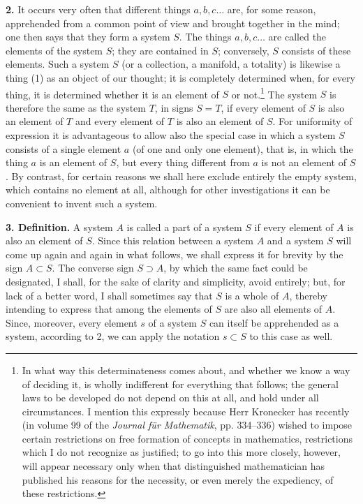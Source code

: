 \documentclass[11pt]{article}
\newcommand{\partof}{\mathrel{\subset}}
\newcommand{\wholeof}{\mathrel{\supset}}
\begin{document}
\noindent\textbf{2.} It occurs very often that different things $a,b,c\ldots$ are, for some reason, apprehended from a common point of view and brought together in the mind; one then says that they form a system $S$. The things $a,b,c\ldots$ are called the elements of the system $S$; they are contained in $S$; conversely, $S$ consists of these elements. Such a system $S$ (or a collection, a manifold, a totality) is likewise a thing (1) as an object of our thought; it is completely determined when, for every thing, it is determined whether it is an element of $S$ or not.\footnote{In what way this determinateness comes about, and whether we know a way of deciding it, is wholly indifferent for everything that follows; the general laws to be developed do not depend on this at all, and hold under all circumstances. I mention this expressly because Herr Kronecker has recently (in volume 99 of the \emph{Journal für Mathematik}, pp. 334--336) wished to impose certain restrictions on free formation of concepts in mathematics, restrictions which I do not recognize as justified; to go into this more closely, however, will appear necessary only when that distinguished mathematician has published his reasons for the necessity, or even merely the expediency, of these restrictions.} The system $S$ is therefore the same as the system $T$, in signs $S=T$, if every element of $S$ is also an element of $T$ and every element of $T$ is also an element of $S$. For uniformity of expression it is advantageous to allow also the special case in which a system $S$ consists of a single element $a$ (of one and only one element), that is, in which the thing $a$ is an element of $S$, but every thing different from $a$ is not an element of $S$. By contrast, for certain reasons we shall here exclude entirely the empty system, which contains no element at all, although for other investigations it can be convenient to invent such a system.

\noindent\textbf{3. Definition.} A system $A$ is called a part of a system $S$ if every element of $A$ is also an element of $S$. Since this relation between a system $A$ and a system $S$ will come up again and again in what follows, we shall express it for brevity by the sign $A\partof S$. The converse sign $S\wholeof A$, by which the same fact could be designated, I shall, for the sake of clarity and simplicity, avoid entirely; but, for lack of a better word, I shall sometimes say that $S$ is a whole of $A$, thereby intending to express that among the elements of $S$ are also all elements of $A$. Since, moreover, every element $s$ of a system $S$ can itself be apprehended as a system, according to 2, we can apply the notation $s\partof S$ to this case as well.
\end{document}
